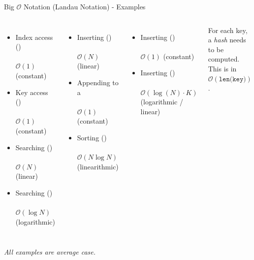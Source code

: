 \begin{frame}{Big $\mathcal{O}$ Notation (Landau Notation) - Examples}
%
\small
\begin{columns}[T]
\begin{itemize}
\item Index access ()\\
 	\\
	$\mathcal{O}(1)$ (constant)
\item Key access ()\\
 	\\
	$\mathcal{O}(1)$ (constant)
\item Searching ()\\
	\\
	$\mathcal{O}(N)$ (linear)
\item Searching ()\\
	\\
	$\mathcal{O}(\log N)$ (logarithmic)
\end{itemize}
%
\begin{itemize}
\item Inserting ()\\
	\\
	$\mathcal{O}(N)$ (linear)
\item Appending to a \\
	\\
	$\mathcal{O}(1)$ (constant)
\item Sorting ()\\
	\\
	$\mathcal{O}(N \log N)$ (linearithmic)
\end{itemize}
%
\begin{itemize}
\item Inserting ()\\
	\\
	$\mathcal{O}(1)$ (constant)
\item Inserting ()\\
	\\
	$\mathcal{O}(\log(N) \cdot K)$ (logarithmic / linear)
\end{itemize}
%
\begin{hintbox}
For each key, a \emph{hash} needs to be computed. This is in $\mathcal{O}(\texttt{len(key)})$.
\end{hintbox}
\end{columns}
%
\vspace{-18pt}
\begin{center}
\emph{All examples are average case.}
\end{center}
%
\end{frame}

